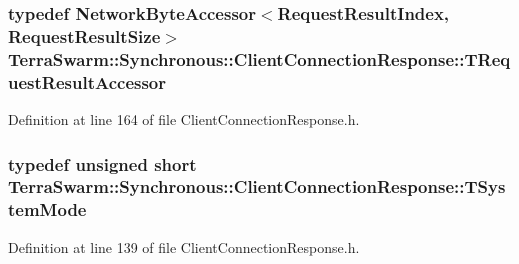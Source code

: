 \hypertarget{class_terra_swarm_1_1_synchronous_1_1_client_connection_response_af1c0b39e843f05dcadd4e2b39c65bcee}{
\subsubsection[{T\-Request\-Result\-Accessor}]{\setlength{\rightskip}{0pt plus 5cm}typedef {\bf Network\-Byte\-Accessor}$<${\bf Request\-Result\-Index}, {\bf Request\-Result\-Size}$>$ {\bf Terra\-Swarm\-::\-Synchronous\-::\-Client\-Connection\-Response\-::\-T\-Request\-Result\-Accessor}\hspace{0.3cm}{\ttfamily [private]}}}\label{class_terra_swarm_1_1_synchronous_1_1_client_connection_response_af1c0b39e843f05dcadd4e2b39c65bcee}


Definition at line 164 of file Client\-Connection\-Response.\-h.

\hypertarget{class_terra_swarm_1_1_synchronous_1_1_client_connection_response_a828bc4f350b4f661c541d988c79f05e9}{
\subsubsection[{T\-System\-Mode}]{\setlength{\rightskip}{0pt plus 5cm}typedef unsigned short {\bf Terra\-Swarm\-::\-Synchronous\-::\-Client\-Connection\-Response\-::\-T\-System\-Mode}}}\label{class_terra_swarm_1_1_synchronous_1_1_client_connection_response_a828bc4f350b4f661c541d988c79f05e9}


Definition at line 139 of file Client\-Connection\-Response.\-h.

